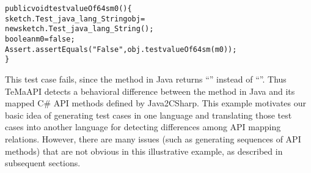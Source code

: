 \begin{CodeOut}%
\begin{alltt}
  public void testvalueOf64sm0()\{
    sketch.Test_java_lang_String obj =
          new sketch.Test_java_lang_String();
    boolean m0 = false;
    Assert.assertEquals("False", obj.testvalueOf64sm(m0));
  \}
\end{alltt}
\end{CodeOut}

This test case fails, since the  method in Java returns ``'' instead of ``''. Thus TeMaAPI detects a behavioral difference between the  method in Java and its mapped C\# API methods defined by Java2CSharp. This example motivates our basic idea of generating test cases in one language and translating those test cases into another language for detecting differences among API mapping relations. However, there are many issues (such as generating sequences of API methods) that are not obvious in this illustrative example, as described in subsequent sections.


